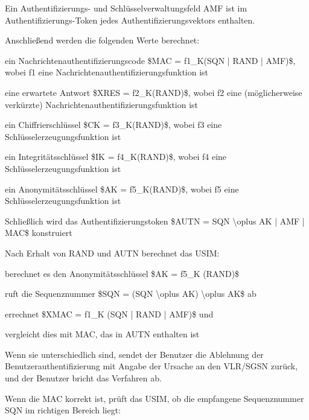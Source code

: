 \documentclass[a4paper]{article}
\begin{document}
\begin{multicols}{3}
\begin{itemize*}
\begin{itemize*}
                  \item Ein Authentifizierungs- und Schlüsselverwaltungsfeld AMF ist im Authentifizierungs-Token jedes Authentifizierungsvektors enthalten.
                  \item Anschließend werden die folgenden Werte berechnet:
                  \begin{itemize*} \item ein Nachrichtenauthentifizierungscode \$MAC = f1\_K(SQN \textbar| RAND \textbar| AMF)\$, wobei f1 eine Nachrichtenauthentifizierungsfunktion ist \item eine erwartete Antwort \$XRES = f2\_K(RAND)\$, wobei f2 eine (möglicherweise verkürzte) Nachrichtenauthentifizierungsfunktion ist \item ein Chiffrierschlüssel \$CK = f3\_K(RAND)\$, wobei f3 eine Schlüsselerzeugungsfunktion ist \item ein Integritätsschlüssel \$IK = f4\_K(RAND)\$, wobei f4 eine Schlüsselerzeugungsfunktion ist \item ein Anonymitätsschlüssel \$AK = f5\_K(RAND)\$, wobei f5 eine Schlüsselerzeugungsfunktion ist \end{itemize*}
                  \item Schließlich wird das Authentifizierungstoken \$AUTN = SQN \textbackslash oplus AK \textbar| AMF \textbar| MAC\$ konstruiert
            \end{itemize*}
            \begin{itemize*}
                  \item Nach Erhalt von RAND und AUTN berechnet das USIM:
                  \item berechnet es den Anonymitätsschlüssel \$AK = f5\_K (RAND)\$
                  \item ruft die Sequenznummer \$SQN = (SQN \textbackslash oplus AK) \textbackslash oplus AK\$ ab
                  \item errechnet \$XMAC = f1\_K (SQN \textbar| RAND \textbar| AMF)\$ und
                  \item vergleicht dies mit MAC, das in AUTN enthalten ist
                  \item Wenn sie unterschiedlich sind, sendet der Benutzer die Ablehnung der Benutzerauthentifizierung mit Angabe der Ursache an den VLR/SGSN zurück, und der Benutzer bricht das Verfahren ab.
                  \item Wenn die MAC korrekt ist, prüft das USIM, ob die empfangene Sequenznummer SQN im richtigen Bereich liegt:

\end{itemize*}
\end{itemize*}
\end{multicols}
\end{document}
